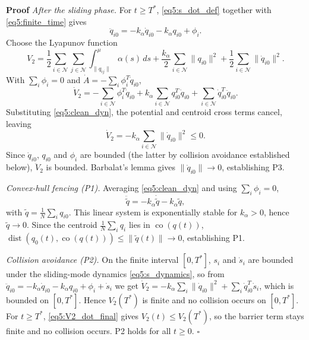 \noindent\textbf{Proof}
\noindent\textit{After the sliding phase.}
For $t\ge T^*$, \eqref{eq5:s_dot_def} together with \eqref{eq5:finite_time} gives
\begin{equation}\label{eq5:clean_dyn}
	\ddot{q}_{i0} = -k_\alpha \dot{q}_{i0} - k_\alpha q_{i0} + \phi_i.
\end{equation}
Choose the Lyapunov function
\begin{equation}\label{eq5:V2}
	V_2 = \frac12\sum_{i\in\mathcal{N}}\sum_{j\in\mathcal{N}}
	\int_{\|q_{ij}\|}^{\mu}\alpha(s)\,ds
	+ \frac{k_\alpha}{2}\sum_{i\in\mathcal{N}}\|q_{i0}\|^2
	+ \frac12\sum_{i\in\mathcal{N}}\|\dot{q}_{i0}\|^2.
\end{equation}
With $\sum_i\phi_i=0$ and $\dot{A} = -\sum_i\phi_i^T\dot{q}_{i0}$,
\begin{equation}\label{eq5:V2_dot}
	\dot{V}_2 = -\sum_{i\in\mathcal{N}}\phi_i^T\dot{q}_{i0}
	+ k_\alpha\sum_{i\in\mathcal{N}}q_{i0}^T\dot{q}_{i0}
	+ \sum_{i\in\mathcal{N}}\dot{q}_{i0}^T\ddot{q}_{i0}.
\end{equation}
Substituting \eqref{eq5:clean_dyn}, the potential and centroid cross terms cancel, leaving
\begin{equation}\label{eq5:V2_dot_final}
	\dot{V}_2 = -k_\alpha\sum_{i\in\mathcal{N}}\|\dot{q}_{i0}\|^2 \le 0.
\end{equation}
Since $\dot{q}_{i0}$, $q_{i0}$ and $\phi_i$ are bounded (the latter by collision avoidance
established below), $\ddot{V}_2$ is bounded. Barbalat's lemma gives
$\|\dot{q}_{i0}\|\to0$, establishing P3.

\noindent\textit{Convex-hull fencing (P1).}
Averaging \eqref{eq5:clean_dyn} and using $\sum_i\phi_i=0$,
\begin{equation}\label{eq5:centroid}
	\ddot{\tilde{q}} = -k_\alpha\dot{\tilde{q}} - k_\alpha\tilde{q},
\end{equation}
with $\tilde{q} = \frac1N\sum_i q_{i0}$. This linear system is exponentially stable for
$k_\alpha>0$, hence $\tilde{q}\to0$. Since the centroid $\frac1N\sum_i q_i$ lies in
$\operatorname{co}(q(t))$,
$\operatorname{dist}(q_0(t), \operatorname{co}(q(t))) \le \|\tilde{q}(t)\| \to 0$,
establishing P1.

\noindent\textit{Collision avoidance (P2).}
On the finite interval $[0,T^*]$, $s_i$ and $\dot{s}_i$ are bounded under the sliding-mode
dynamics \eqref{eq5:s_dynamics}, so from $\ddot{q}_{i0} = -k_\alpha\dot{q}_{i0}
- k_\alpha q_{i0} + \phi_i + \dot{s}_i$ we get
$\dot{V}_2 = -k_\alpha\sum_i\|\dot{q}_{i0}\|^2 + \sum_i\dot{q}_{i0}^T\dot{s}_i$, which is
bounded on $[0,T^*]$. Hence $V_2(T^*)$ is finite and no collision occurs on $[0,T^*]$.
For $t\ge T^*$, \eqref{eq5:V2_dot_final} gives $V_2(t) \le V_2(T^*)$, so the barrier term
stays finite and no collision occurs. P2 holds for all $t\ge0$.
\hfill$\square$

